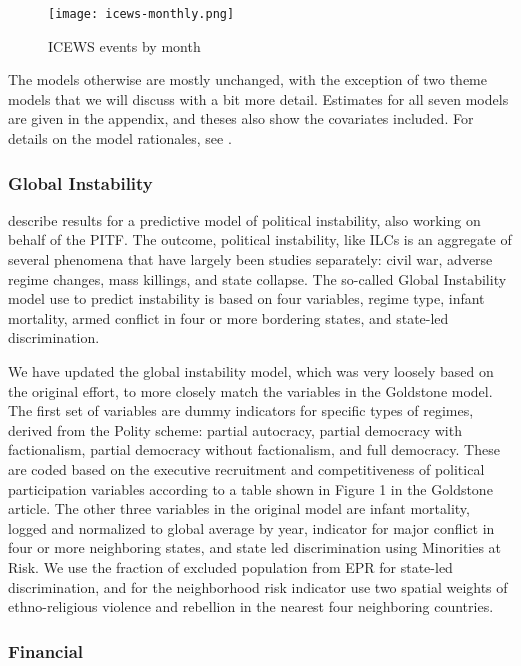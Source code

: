 \documentclass[pdftex,11pt]{article}
\begin{document}
\begin{figure}
\texttt{[image: icews-monthly.png]}
\caption{ICEWS events by month}
\label{icews-monthly}
\end{figure}

The models otherwise are mostly unchanged, with the exception of two theme models that we will discuss with a bit more detail. Estimates for all seven models are given in the appendix, and theses also show the covariates included. For details on the model rationales, see \citet{beger:dorff:ward:2014a}.

\subsubsection{Global Instability} 

\citet{goldstone:bates:etal:2010} describe results for a predictive model of political instability, also working on behalf of the PITF. The outcome, political instability, like ILCs is an aggregate of several phenomena that have largely been studies separately: civil war, adverse regime changes, mass killings, and state collapse. The so-called Global Instability model \citep{goldstone:bates:etal:2010} use to predict instability is based on four variables, regime type, infant mortality, armed conflict in four or more bordering states, and state-led discrimination. 

We have updated the global instability model, which was very loosely based on the original effort, to more closely match the variables in the Goldstone model. The first set of variables are dummy indicators for specific types of regimes, derived from the Polity scheme: partial autocracy, partial democracy with factionalism, partial democracy without factionalism, and full democracy. These are coded based on the executive recruitment and competitiveness of political participation variables according to a table shown in Figure 1 in the Goldstone article. The other three variables in the original model are infant mortality, logged and normalized to global average by year, indicator for major conflict in four or more neighboring states, and state led discrimination using Minorities at Risk. We use the fraction of excluded population from EPR for state-led discrimination, and for the neighborhood risk indicator use two spatial weights of ethno-religious violence and rebellion in the nearest four neighboring countries.  

\subsubsection{Financial}
\end{document}
